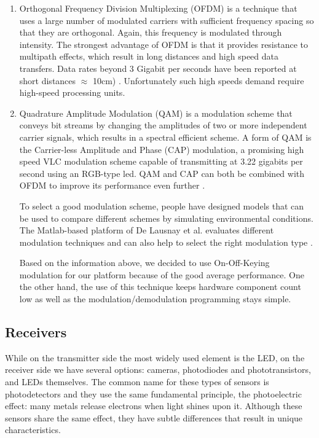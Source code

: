\begin{enumerate}
\item Orthogonal Frequency Division Multiplexing (OFDM) is a technique that
uses a large number of modulated carriers with sufficient frequency spacing
so that they are orthogonal. Again, this frequency is modulated through intensity.
The strongest advantage of OFDM is that it provides resistance to
multipath effects, which result in long distances and high speed data transfers.
Data rates beyond 3 Gigabit per seconds have been reported at short
distances $\approx$ 10cm) \citep{modulationStandard}. Unfortunately such high speeds demand require
high-speed processing units.

\item  Quadrature Amplitude Modulation (QAM) is a modulation scheme that conveys
bit streams by changing the amplitudes of two or more independent
carrier signals, which results in a spectral efficient scheme. A form of
QAM is the Carrier-less Amplitude and Phase (CAP) modulation, a promising
high speed VLC modulation scheme capable of transmitting at 3.22
gigabits per second using an RGB-type led. QAM and CAP can both
be combined with OFDM to improve its performance even further \citep{ofdm-cap}.

To select a good modulation scheme, people have designed models that can
be used to compare different schemes by simulating environmental conditions.
The Matlab-based platform of De Lausnay et al. evaluates different modulation
techniques and can also help to select the right modulation type \citep{matlab}.

Based on the information above, we decided to use On-Off-Keying modulation
for our platform because of the good average performance. One the other hand, the use of this technique keeps hardware component count low as well as the modulation/demodulation programming stays simple.

\end{enumerate}

\subsection{Receivers}

While on the transmitter side the most widely used element is the LED, on the
receiver side we have several options: cameras, photodiodes and phototransistors,
and LEDs themselves. The common name for these types of sensors is
photodetectors and they use the same fundamental principle, the photoelectric
effect: many metals release electrons when light shines upon it. Although these
sensors share the same effect, they have subtle differences that result in unique
characteristics.

